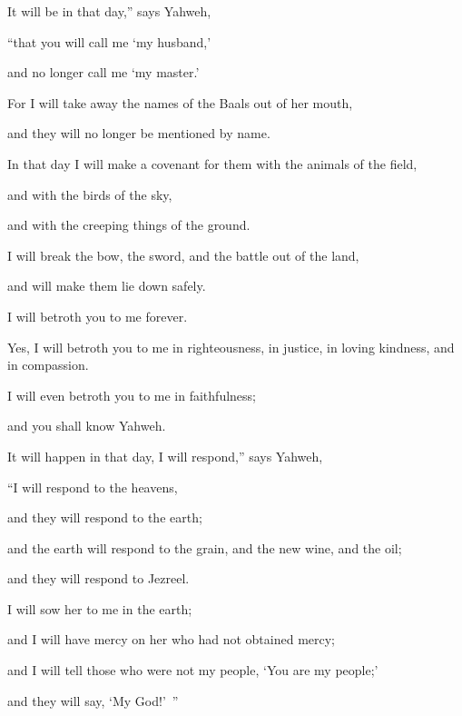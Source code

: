 {\par }{\Q {}It will be in that day,” says Yahweh,
\par }{\QB “that you will call me ‘my husband,’
\par }{\QB and no longer call me ‘my master.’
\par }{\Q {}For I will take away the names of the Baals out of her mouth,
\par }{\QB and they will no longer be mentioned by name.
\par }{\Q {}In that day I will make a covenant for them with the animals of the field,
\par }{\QB and with the birds of the sky,
\par }{\QB and with the creeping things of the ground.
\par }{\Q I will break the bow, the sword, and the battle out of the land,
\par }{\QB and will make them lie down safely.
\par }{\Q {}I will betroth you to me forever.
\par }{\QB Yes, I will betroth you to me in righteousness, in justice, in loving kindness, and in compassion.
\par }{\Q {}I will even betroth you to me in faithfulness;
\par }{\QB and you shall know Yahweh.
\par }{\Q {}It will happen in that day, I will respond,” says Yahweh,
\par }{\QB “I will respond to the heavens,
\par }{\QB and they will respond to the earth;
\par }{\QB {}and the earth will respond to the grain, and the new wine, and the oil;
\par }{\QB and they will respond to Jezreel.
\par }{\Q {}I will sow her to me in the earth;
\par }{\QB and I will have mercy on her who had not obtained mercy;
\par }{\QB and I will tell those who were not my people, ‘You are my people;’
\par }{\QB and they will say, ‘My God!’ ”

}
